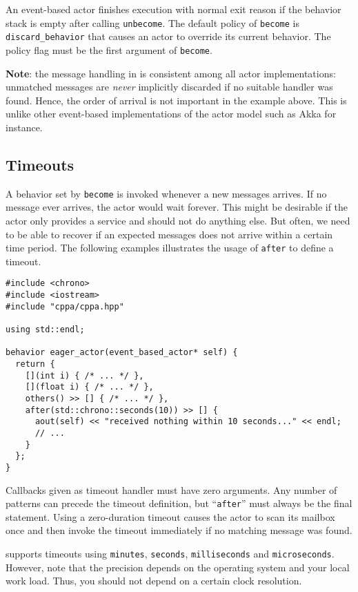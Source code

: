 An event-based actor finishes execution with normal exit reason if the behavior stack is empty after calling \lstinline^unbecome^.
The default policy of \lstinline^become^ is \lstinline^discard_behavior^ that causes an actor to override its current behavior.
The policy flag must be the first argument of \lstinline^become^.

\textbf{Note}: the message handling in \libcppa is consistent among all actor implementations: unmatched messages are \textit{never} implicitly discarded if no suitable handler was found.
Hence, the order of arrival is not important in the example above.
This is unlike other event-based implementations of the actor model such as Akka for instance.

\clearpage
\subsection{Timeouts}
\label{Sec::Receive::Timeouts}

A behavior set by \lstinline^become^ is invoked whenever a new messages arrives.
If no message ever arrives, the actor would wait forever.
This might be desirable if the actor only provides a service and should not do anything else.
But often, we need to be able to recover if an expected messages does not arrive within a certain time period. The following examples illustrates the usage of \lstinline^after^ to define a timeout.

\begin{lstlisting}
#include <chrono>
#include <iostream>
#include "cppa/cppa.hpp"

using std::endl;

behavior eager_actor(event_based_actor* self) {
  return {
    [](int i) { /* ... */ },
    [](float i) { /* ... */ },
    others() >> [] { /* ... */ },
    after(std::chrono::seconds(10)) >> [] {
      aout(self) << "received nothing within 10 seconds..." << endl;
      // ...
    }
  };
}
\end{lstlisting}

Callbacks given as timeout handler must have zero arguments.
Any number of patterns can precede the timeout definition, but  ``\lstinline^after^'' must always be the final statement.
Using a zero-duration timeout causes the actor to scan its mailbox once and then invoke the timeout immediately if no matching message was found.

\libcppa supports timeouts using \lstinline^minutes^, \lstinline^seconds^, \lstinline^milliseconds^ and \lstinline^microseconds^.
However, note that the precision depends on the operating system and your local work load.
Thus, you should not depend on a certain clock resolution.

